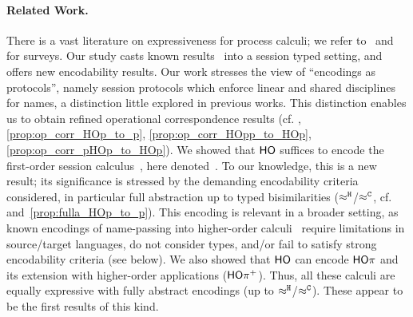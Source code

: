 \documentclass[runningheads]{llncs}
\begin{document}
{{\paragraph{Related Work.}
There is a vast literature on expressiveness for process calculi; we refer to~\cite{DBLP:journals/entcs/Parrow08} 
and \cite[\S\,2.3]{PerezPhD10} for surveys.
Our study casts known results~\cite{SangiorgiD:expmpa} into a session typed setting, and
offers new encodability results.
Our work stresses the 
view of ``encodings as protocols'', namely session protocols which
enforce linear and shared disciplines for names, a distinction
little explored in %
previous works.
This distinction %
enables us to obtain 
 refined 
operational correspondence results (cf. , \ref{prop:op_corr_HOp_to_p}, \ref{prop:op_corr_HOpp_to_HOp}, \ref{prop:op_corr_pHOp_to_HOp}).
We showed that
$\mathsf{HO}$ suffices to encode   the first-order session
calculus~\cite{honda.vasconcelos.kubo:language-primitives}, here denoted~\sessp. %
To our knowledge, this is a new result; %
its significance is stressed by the demanding encodability criteria  considered, in particular full abstraction up to typed bisimilarities
($\approx^\mathtt{H}$/$\approx^\mathtt{C}$, cf.  and~\ref{prop:fulla_HOp_to_p}).
This encoding is relevant in a broader setting, as known encodings 
of name-passing into higher-order calculi~\cite{SaWabook,BundgaardHG06,DBLP:journals/entcs/MeredithR05,XuActa2012,DBLP:journals/corr/XuYL15}  require limitations
in source/target languages,
do not consider types,
 and/or fail to satisfy strong encodability criteria (see below). 
We also showed that $\mathsf{HO}$ can encode $\mathsf{HO}\pi$ and its extension with
higher-order applications ($\mathsf{HO\pi^{+}}$). 
Thus, %
all these  calculi are equally expressive with fully
abstract encodings (up to $\approx^\mathtt{H}$/$\approx^\mathtt{C}$).  
These appear to be the first results of this kind.

}}
\end{document}
